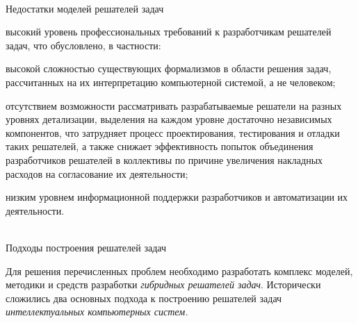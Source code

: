 \begin{frame}{\\Недостатки моделей решателей задач}
	\topline
	\justifying
	\vspace*{\fill}\\
	\begin{textitemize}
		\item высокий уровень профессиональных требований к разработчикам решателей задач, что обусловлено, в частности:
		\begin{textitemize}
			\item высокой сложностью существующих формализмов в области решения задач, рассчитанных на их интерпретацию компьютерной системой, а не человеком;
			\item отсутствием возможности рассматривать разрабатываемые решатели на разных уровнях детализации, выделения на каждом уровне достаточно независимых компонентов, что затрудняет процесс проектирования, тестирования и отладки таких решателей, а также снижает эффективность попыток объединения разработчиков решателей в коллективы по причине увеличения накладных расходов на согласование их деятельности;
			\item низким уровнем информационной поддержки разработчиков и автоматизации их деятельности.
		\end{textitemize}
	\end{textitemize}
\end{frame}

\begin{frame}{\\Подходы построения решателей задач}
	\topline
	\justifying
	\vspace*{\fill}\\
	\footnotesize{
		Для решения перечисленных проблем необходимо разработать комплекс моделей, методики и средств разработки \textit{гибридных решателей задач}. Исторически сложились два основных подхода к построению решателей задач \textit{интеллектуальных компьютерных систем.}\\
		\begin{SCn}
			\begin{scnindent}
			\end{scnindent}
		\end{SCn}
	}
\end{frame}

